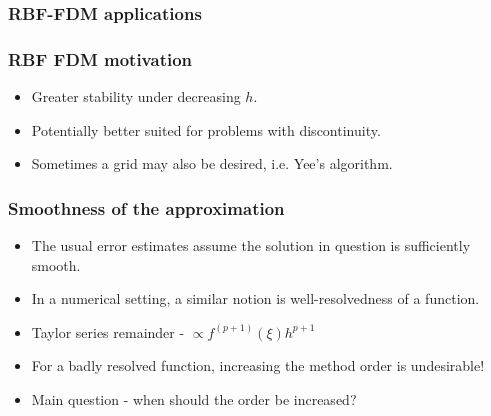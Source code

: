 \documentclass{beamer}
\begin{document}
\begin{frame}
\frametitle{RBF-FDM applications}
\end{frame}

\begin{frame}
\frametitle{RBF FDM motivation}
\begin{itemize}
\item<1-> Greater stability under decreasing $h$.
\item<2-> Potentially better suited for problems with discontinuity.
\item<3-> Sometimes a grid may also be desired, i.e. Yee's algorithm.
\end{itemize}
\end{frame}






\begin{frame}
\frametitle{Smoothness of the approximation}
\begin{itemize}
\item<1-> The usual error estimates assume the solution in question is sufficiently smooth.
\item<2-> In a numerical setting, a similar notion is well-resolvedness of a function.
\item<3-> Taylor series remainder - $\propto f^{(p+1)}(\xi) h^{p+1}$
\item<4-> For a badly resolved function, increasing the method order is undesirable!
\item<5-> Main question - when should the order be increased?
\end{itemize}
\end{frame}
\end{document}
